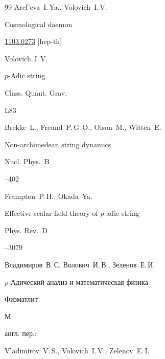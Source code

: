 \begin{thebibliography}{99}
\by Aref'eva~I.\,Ya.,  Volovich~I.\,V.

\eprint Cosmological daemon

\arxiv \href{http://arxiv.org/abs/1103.0273}{1103.0273} [hep-th]






\by Volovich~I.\,V.

\paper $p$-Adic string

\jour Class. Quant. Grav.




\papernumber L83




\by  Brekke~L., Freund~P.\,G.\,O., Olson~M., Witten~E.

\paper Non-archimedean string dynamics

\jour Nucl. Phys.~B




--402

 


\by Frampton~P.\,H.,   Okada~Ya.

\paper Effective scalar field theory of $p$-adic string

\jour Phys. Rev.~D 




--3079




\by Владимиров~В.\,С, Волович~И.\,В., Зеленов~Е.\,И.

\book $p$-Адический анализ и математическая физика


\publ Физматлит

\publaddr М.


\transl

англ. пер.:~

\by Vladimirov~V.\,S., Volovich~I.\,V., Zelenov~E.\,I.


\end{thebibliography}
